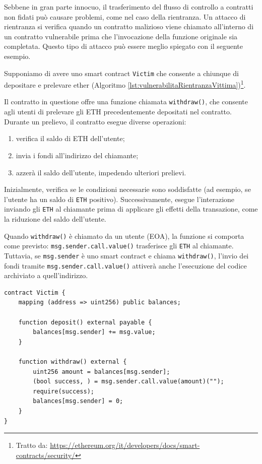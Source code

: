 Sebbene in gran parte innocuo, il trasferimento del flusso di controllo a contratti non fidati può causare problemi, come nel caso della rientranza. 
Un attacco di rientranza si verifica quando un contratto malizioso viene chiamato all'interno di un contratto vulnerabile prima che l'invocazione della 
funzione originale sia completata. Questo tipo di attacco può essere meglio spiegato con il seguente esempio.

Supponiamo di avere uno smart contract {\tt Victim} che consente a chiunque di depositare e prelevare ether 
(Algoritmo \ref*{lst:vulnerabilitaRientranzaVittima})\footnote{Tratto da: \url{https://ethereum.org/it/developers/docs/smart-contracts/security/}}.

Il contratto in questione offre una funzione chiamata {\tt withdraw()}, che consente agli utenti di prelevare gli ETH precedentemente depositati nel 
contratto. Durante un prelievo, il contratto esegue diverse operazioni:
\begin{enumerate}
    \item verifica il saldo di ETH dell'utente;
    \item invia i fondi all'indirizzo del chiamante;
    \item azzerà il saldo dell'utente, impedendo ulteriori prelievi.
\end{enumerate}

Inizialmente, verifica se le condizioni necessarie sono soddisfatte (ad esempio, se l'utente ha un saldo di {\tt ETH} positivo). Successivamente, esegue 
l'interazione inviando gli {\tt ETH} al chiamante prima di applicare gli effetti della transazione, come la riduzione del saldo dell'utente.

Quando {\tt withdraw()} è chiamato da un utente (EOA), la funzione si comporta come previsto: {\tt msg.sender.call.value()} trasferisce gli {\tt ETH} 
al chiamante. Tuttavia, se {\tt msg.sender} è uno smart contract e chiama {\tt withdraw()}, l'invio dei fondi tramite {\tt msg.sender.call.value()} 
attiverà anche l'esecuzione del codice archiviato a quell'indirizzo.

\begin{algorithm}[ht]
\caption{Vulnerabilità di rientranza in uno smart contract vittima.}
\label{lst:vulnerabilitaRientranzaVittima}
\begin{lstlisting}[style=customsolidity, language=Solidity]
contract Victim {
    mapping (address => uint256) public balances;

    function deposit() external payable {
        balances[msg.sender] += msg.value;
    }

    function withdraw() external {
        uint256 amount = balances[msg.sender];
        (bool success, ) = msg.sender.call.value(amount)("");
        require(success);
        balances[msg.sender] = 0;
    }
}
\end{lstlisting}
\end{algorithm}

